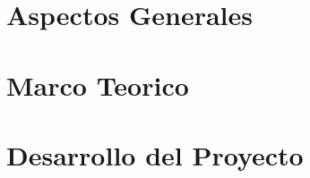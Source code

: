 \documentclass[letterpaper,12pt]{report}
\begin{document}
\begin{spacing}{1.05} %





\renewcommand{\contentsname}{Índice General}
\renewcommand{\listfigurename}{Índice de Figuras}
\renewcommand{\listtablename}{Índice de Tablas}
\renewcommand\tablename{Tabla}
\tableofcontents

\cleardoublepage
{} %
\listoffigures

\cleardoublepage
{} %
\listoftables




\clearpage
{}
\setcounter{page}{1}



\part{Aspectos Generales}
 

\part{Marco Teorico}


\part{Desarrollo del Proyecto}




\renewcommand\bibname{Resultados}

\renewcommand\bibname{Conclusiones}

\renewcommand\bibname{Recomendaciones}

\renewcommand\bibname{TrabajosFuturos}

\end{spacing}



{}
\begin{spacing}{1.0}
\nocite{*}

\end{spacing}
\end{document}
